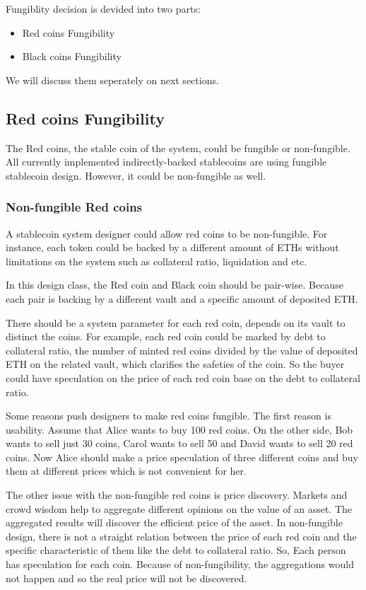 Fungiblity decision is devided into two parts:
\begin{itemize}
  \item Red coins Fungibility
  \item Black coins Fungibility
\end{itemize} 
We will discuss them seperately on next sections.


\subsection{Red coins Fungibility}
The Red coins, the stable coin of the system, could be fungible or non-fungible. All currently implemented indirectly-backed stablecoins are using fungible stablecoin design. However, it could be non-fungible as well.

\subsubsection{Non-fungible Red coins}
A stablecoin system designer could allow red coins to be non-fungible. For instance, each token could be backed by a different amount of ETHs without limitations on the system such as collateral ratio, liquidation and etc.

In this design class, the Red coin and Black coin should be pair-wise. Because each pair is backing by a different vault and a specific amount of deposited ETH.

There should be a system parameter for each red coin, depends on its vault to distinct the coins.
For example, each red coin could be marked by debt to collateral ratio, the number of minted red coins divided by the value of deposited ETH on the related vault, which clarifies the safeties of the coin.
So the buyer could have speculation on the price of each red coin base on the debt to collateral ratio.

Some reasons push designers to make red coins fungible. The first reason is usability. Assume that Alice wants to buy 100 red coins. On the other side, Bob wants to sell just 30 coins, Carol wants to sell 50 and David wants to sell 20 red coins. Now Alice should make a price speculation of three different coins and buy them at different prices which is not convenient for her.

The other issue with the non-fungible red coins is price discovery. Markets and crowd wisdom help to aggregate different opinions on the value of an asset. The aggregated results will discover the efficient price of the asset. In non-fungible design, there is not a straight relation between the price of each red coin and the specific characteristic of them like the debt to collateral ratio. So, Each person has speculation for each coin. Because of non-fungibility, the aggregations would not happen and so the real price will not be discovered.

